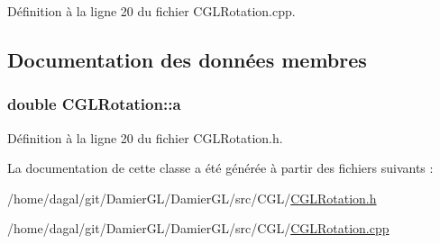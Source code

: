 Définition à la ligne 20 du fichier C\-G\-L\-Rotation.\-cpp.



\subsection{Documentation des données membres}
\hypertarget{class_c_g_l_rotation_aa5ffb501251affad642b454910540c6c}{
\subsubsection[{a}]{\setlength{\rightskip}{0pt plus 5cm}double C\-G\-L\-Rotation\-::a\hspace{0.3cm}{\ttfamily [protected]}}}\label{class_c_g_l_rotation_aa5ffb501251affad642b454910540c6c}


Définition à la ligne 20 du fichier C\-G\-L\-Rotation.\-h.



La documentation de cette classe a été générée à partir des fichiers suivants \-:\begin{DoxyCompactItemize}
\item 
/home/dagal/git/\-Damier\-G\-L/\-Damier\-G\-L/src/\-C\-G\-L/\hyperlink{_c_g_l_rotation_8h}{C\-G\-L\-Rotation.\-h}\item 
/home/dagal/git/\-Damier\-G\-L/\-Damier\-G\-L/src/\-C\-G\-L/\hyperlink{_c_g_l_rotation_8cpp}{C\-G\-L\-Rotation.\-cpp}\end{DoxyCompactItemize}

